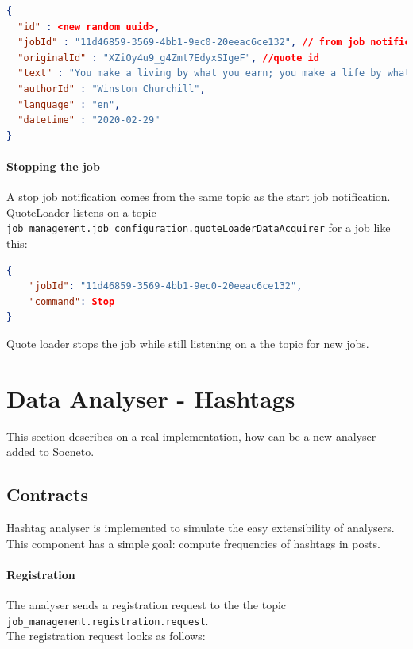 \begin{lstlisting}[language=json,firstnumber=1]
{
  "id" : <new random uuid>,
  "jobId" : "11d46859-3569-4bb1-9ec0-20eeac6ce132", // from job notification
  "originalId" : "XZiOy4u9_g4Zmt7EdyxSIgeF", //quote id
  "text" : "You make a living by what you earn; you make a life by what you give.",
  "authorId" : "Winston Churchill",
  "language" : "en",
  "datetime" : "2020-02-29"
}
\end{lstlisting}
       
\paragraph{Stopping the job}

A stop job notification comes from the same topic as the start job notification. QuoteLoader listens on a topic \newline \texttt{job\_management.job\_configuration.quoteLoaderDataAcquirer} for a job like this:

\begin{lstlisting}[language=json,firstnumber=1]
{
    "jobId": "11d46859-3569-4bb1-9ec0-20eeac6ce132",
    "command": Stop
}
\end{lstlisting}

Quote loader stops the job while still listening on a the topic for new jobs.

\section{Data Analyser - Hashtags}\label{section:custom_ds}

This section describes on a real implementation, how can be a new analyser added to  Socneto.

\subsection{Contracts}

Hashtag analyser is implemented to simulate the easy extensibility of analysers. This component has a simple goal: compute frequencies of hashtags in posts.

\paragraph{Registration}

The analyser sends a registration request to the the topic \newline \texttt{job\_management.registration.request}. \\The registration request looks as follows:

